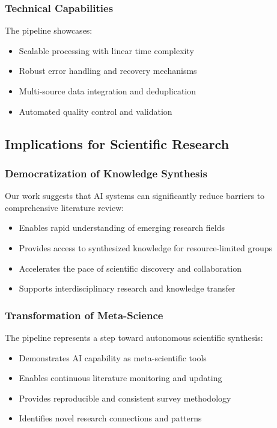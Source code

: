 \subsubsection{Technical Capabilities}

The pipeline showcases:
\begin{itemize}
    \item Scalable processing with linear time complexity
    \item Robust error handling and recovery mechanisms
    \item Multi-source data integration and deduplication
    \item Automated quality control and validation
\end{itemize}

\subsection{Implications for Scientific Research}

\subsubsection{Democratization of Knowledge Synthesis}

Our work suggests that AI systems can significantly reduce barriers to comprehensive literature review:
\begin{itemize}
    \item Enables rapid understanding of emerging research fields
    \item Provides access to synthesized knowledge for resource-limited groups
    \item Accelerates the pace of scientific discovery and collaboration
    \item Supports interdisciplinary research and knowledge transfer
\end{itemize}

\subsubsection{Transformation of Meta-Science}

The pipeline represents a step toward autonomous scientific synthesis:
\begin{itemize}
    \item Demonstrates AI capability as meta-scientific tools
    \item Enables continuous literature monitoring and updating
    \item Provides reproducible and consistent survey methodology
    \item Identifies novel research connections and patterns
\end{itemize}

